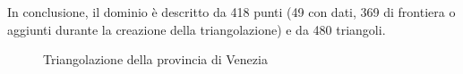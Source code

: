 \documentclass[a4paper,11pt,twoside,openright]{book}							%
\begin{document}
In conclusione, il dominio è descritto da 418 punti (49 con dati, 369 di frontiera o aggiunti durante la creazione della triangolazione) e da 480 triangoli.
\begin{figure}[t]
\centering
{}
\caption{Triangolazione della provincia di Venezia}
\label{fig:Ven_triang}
\end{figure}
\end{document}
